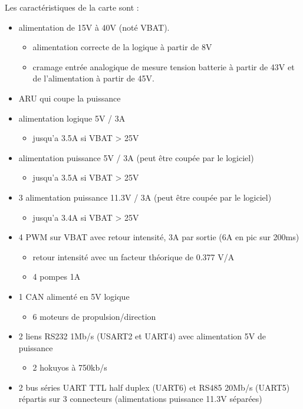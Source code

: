 Les caractéristiques de la carte sont :
\begin{itemize}
	\item alimentation de 15V à 40V (noté VBAT).
		\begin{itemize}
			\item alimentation correcte de la logique à partir de 8V
			\item cramage entrée analogique de mesure tension batterie à partir de 43V et de l'alimentation à partir de 45V.
		\end{itemize}
	\item ARU qui coupe la puissance
	\item alimentation logique 5V / 3A
		\begin{itemize}
			\item jusqu'a 3.5A si VBAT > 25V
		\end{itemize}
	\item alimentation puissance 5V / 3A (peut être coupée par le logiciel)
		\begin{itemize}
			\item jusqu'a 3.5A si VBAT > 25V
		\end{itemize}
	\item 3 alimentation puissance 11.3V / 3A (peut être coupée par le logiciel)
		\begin{itemize}
			\item jusqu'a 3.4A si VBAT > 25V
		\end{itemize}
	\item 4 PWM sur VBAT avec retour intensité, 3A par sortie (6A en pic sur 200ms)
		\begin{itemize}
			\item retour intensité avec un facteur théorique de 0.377 V/A
			\item 4 pompes 1A
		\end{itemize}
	\item 1 CAN alimenté en 5V logique
		\begin{itemize}
			\item 6 moteurs de propulsion/direction
		\end{itemize}
	\item 2 liens RS232 1Mb/s (USART2 et UART4) avec alimentation 5V de puissance
		\begin{itemize}
			\item 2 hokuyos à 750kb/s
		\end{itemize}
	\item 2 bus séries UART TTL half duplex (UART6) et RS485 20Mb/s (UART5) répartis sur 3 connecteurs (alimentations puissance 11.3V séparées)

\end{itemize}
